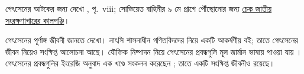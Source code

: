 \documentclass[../../../include/open-logic-section]{subfiles}
\begin{document}
\par\smallskip\noindent গেৎসেনের আটকের জন্য দেখো \citet{Gentzen1969}, পৃ.~viii; সোভিয়েত বাহিনীর ৯ মে প্রাগে পৌঁছোনোর জন্য \href{https://www.nacr.cz/labyrint/1945-rok-zlomu/kveten1945/08-05-1945}{চেক জাতীয় সংরক্ষণাগারের কালপঞ্জি}।

\begin{reading}
গেৎসেনের পূর্ণাঙ্গ জীবনী জানতে \citet{Menzler-Trott2007}
দেখো। নাৎসি শাসনাধীন গণিতবিদদের নিয়ে
\citet{Segal2014} একটি আকর্ষণীয় বই; তাতে গেৎসেনের
জীবন নিয়েও সংক্ষিপ্ত আলোচনা আছে। যৌক্তিক
নিষ্পাদন নিয়ে গেৎসেনের প্রবন্ধগুলি মূল জার্মান ভাষায়
পাওয়া যায় \citep{Gentzen1935a,Gentzen1935b}।
গেৎসেনের প্রবন্ধগুলির ইংরেজি অনুবাদ এক খণ্ডে
সংকলন করেছেন \citet{Gentzen1969}; তাতে একটি
সংক্ষিপ্ত জীবনীও রয়েছে।
\end{reading}
\end{document}
